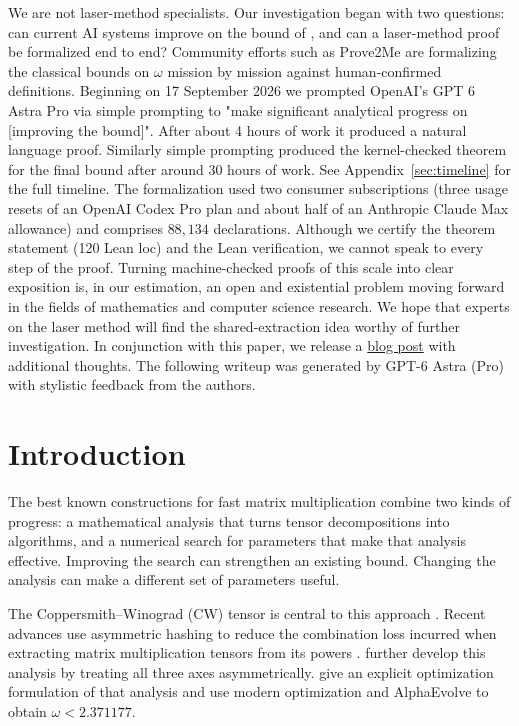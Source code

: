 \documentclass[11pt,a4paper]{article}
\newcommand{\CW}{\mathrm{CW}}
\begin{document}
We are not laser-method specialists. Our investigation began with two questions: can current AI systems improve on the bound of \citet{dupont2026}, and can a laser-method proof be formalized end to end? Community efforts such as Prove2Me \citep{prove2me2026} are formalizing the classical bounds on $\omega$ mission by mission against human-confirmed definitions. Beginning on 17 September 2026 we prompted OpenAI's GPT 6 Astra Pro via simple prompting to "make significant analytical progress on [improving the bound]". After about 4 hours of work it produced a natural language proof. Similarly simple prompting produced the kernel-checked theorem for the final bound after around 30 hours of work. See Appendix~\ref{sec:timeline} for the full timeline. The formalization used two consumer subscriptions (three usage resets of an OpenAI Codex Pro plan and about half of an Anthropic Claude Max allowance) and comprises $88{,}134$ declarations. Although we certify the theorem statement (120 Lean loc) and the Lean verification, we cannot speak to every step of the proof. Turning machine-checked proofs of this scale into clear exposition is, in our estimation, an open and existential problem moving forward in the fields of mathematics and computer science research. We hope that experts on the laser method will find the shared-extraction idea worthy of further investigation. In conjunction with this paper, we release a \href{https://oliverproudfoot.substack.com/p/pocket-sized-super-mathematical-intelligence}{blog post} with additional thoughts. The following writeup was generated by GPT-6 Astra (Pro) with stylistic feedback from the authors.

\section{Introduction}\label{sec:Intro}

The best known constructions for fast matrix multiplication combine two kinds of progress: a mathematical analysis that turns tensor decompositions into algorithms, and a numerical search for parameters that make that analysis effective. Improving the search can strengthen an existing bound. Changing the analysis can make a different set of parameters useful.

The Coppersmith--Winograd (\(\CW\)) tensor is central to this approach \citep{cw1990}. Recent advances use asymmetric hashing to reduce the combination loss incurred when extracting matrix multiplication tensors from its powers \citep{dwz2023,vxxz2024}. \citet{alman2025} further develop this analysis by treating all three axes asymmetrically. \citet{dupont2026} give an explicit optimization formulation of that analysis and use modern optimization and AlphaEvolve to obtain $\omega<2.371177$.
\end{document}
